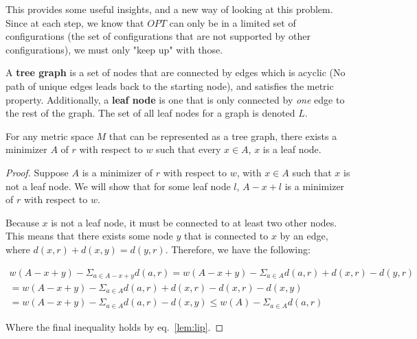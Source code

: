 This provides some useful insights, and a new way of looking at this problem. Since at each step, we know that $OPT$ can only be in a limited set of configurations (the set of configurations that are not supported by other configurations), we must only "keep up" with those.

\begin{definition}
    A \textbf{tree graph} is a set of nodes that are connected by edges which is acyclic (No path of unique edges leads back to the starting node), and satisfies the metric property. Additionally, a \textbf{leaf node} is one that is only connected by \textit{one} edge to the rest of the graph. The set of all leaf nodes for a graph is denoted $L$.
\end{definition}

\begin{lemma}
    \label{lem:leaf}
    For any metric space $M$ that can be represented as a tree graph, there exists a minimizer $A$ of $r$ with respect to $w$ such that every $x \in A$, $x$ is a leaf node.
\end{lemma}

\begin{proof}
    Suppose $A$ is a minimizer of $r$ with respect to $w$, with $x \in A$ such that $x$ is not a leaf node. We will show that for some leaf node $l$, $A-x+l$ is a minimizer of $r$ with respect to $w$. 

    Because $x$ is not a leaf node, it must be connected to at least two other nodes. This means that there exists some node $y$ that is connected to $x$ by an edge, where $d(x,r) + d(x,y) = d(y,r)$. Therefore, we have the following:

    \begin{equation*}
        \begin{gathered}
            w(A-x+y) - \Sigma_{a \in A-x+y} d(a,r) = w(A-x+y) - \Sigma_{a \in A} d(a,r) + d(x,r) - d(y,r) \\
            = w(A-x+y) - \Sigma_{a \in A} d(a,r) + d(x,r) - d(x,r) - d(x,y)\\
            = w(A-x+y) - \Sigma_{a \in A} d(a,r) - d(x,y) \leq w(A) - \Sigma_{a \in A} d(a,r)
        \end{gathered}
    \end{equation*}

    Where the final inequality holds by eq.~\ref{lem:lip}.
\end{proof}

